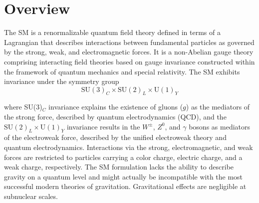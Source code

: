 \section{Overview}
\label{sec:sm_overview}

The SM is a renormalizable quantum field theory defined in terms of a Lagrangian that describes interactions between fundamental particles as governed by the strong, weak, and electromagnetic forces. It is a non-Abelian gauge theory comprising interacting field theories based on gauge invariance constructed within the framework of quantum mechanics and special relativity. The SM exhibits invariance under the symmetry group
\begin{equation}
    \text{SU}(3)_C \times \text{SU}(2)_L \times \text{U}(1)_Y
\end{equation}

where SU(3)$_C$ invariance explains the existence of gluons ($g$) as the mediators of the strong force, described by quantum electrodynamics (QCD), and the $\text{SU}(2)_L \times \text{U}(1)_Y$ invariance results in the $W^\pm$, $Z^0$, and $\gamma$ bosons as mediators of the electroweak force, described by the unified electroweak theory and quantum electrodynamics. Interactions via the strong, electromagnetic, and weak forces are restricted to particles carrying a color charge, electric charge, and a weak charge, respectively. The SM formulation lacks the ability to describe gravity on a quantum level and might actually be incompatible with the most successful modern theories of gravitation. Gravitational effects are negligible at subnuclear scales.




